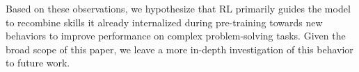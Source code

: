 Based on these observations, we hypothesize that RL primarily guides the model to recombine skills it already internalized during pre-training towards new behaviors to improve performance on complex problem-solving tasks. Given the broad scope of this paper, we leave a more in-depth investigation of this behavior to future work.




